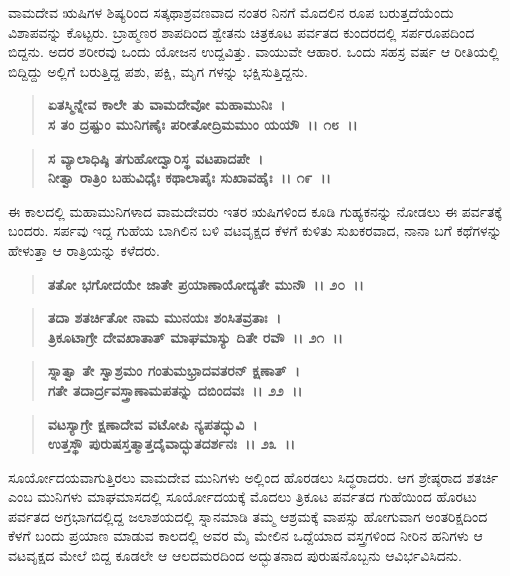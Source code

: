 ವಾಮದೇವ ಋಷಿಗಳ ಶಿಷ್ಯರಿಂದ ಸತ್ಕಥಾಶ್ರವಣವಾದ ನಂತರ ನಿನಗೆ ಮೊದಲಿನ ರೂಪ ಬರುತ್ತದೆಯೆಂದು ವಿಶಾಪವನ್ನು ಕೊಟ್ಟರು. ಬ್ರಾಹ್ಮಣರ ಶಾಪದಿಂದ ಶ್ವೇತನು ಚಿತ್ರಕೂಟ ಪರ್ವತದ ಕುಂದರದಲ್ಲಿ ಸರ್ಪರೂಪದಿಂದ ಬಿದ್ದನು. ಅದರ ಶರೀರವು ಒಂದು ಯೋಜನ ಉದ್ದವಿತ್ತು. ವಾಯುವೇ ಆಹಾರ. ಒಂದು ಸಹಸ್ರ ವರ್ಷ ಆ ರೀತಿಯಲ್ಲಿ ಬಿದ್ದಿದ್ದು ಅಲ್ಲಿಗೆ ಬರುತ್ತಿದ್ದ ಪಶು, ಪಕ್ಷಿ, ಮೃಗ ಗಳನ್ನು ಭಕ್ಷಿಸುತ್ತಿದ್ದನು.

\begin{verse}
\textbf{ಏತಸ್ಮಿನ್ನೇವ ಕಾಲೇ ತು ವಾಮದೇವೋ ಮಹಾಮುನಿಃ~।}\\\textbf{ಸ ತಂ ದ್ರಷ್ಟುಂ ಮುನಿಗಣೈಃ ಪರೀತೋದ್ರಿಮಮುಂ ಯಯೌ~।। ೧೮~।। }
\end{verse}

\begin{verse}
\textbf{ಸ ವ್ಯಾಲಾಧಿಷ್ಠಿ ತಗುಹೋದ್ವಾರಿಸ್ಥ ವಟಪಾದಪೇ~।}\\\textbf{ನೀತ್ವಾ ರಾತ್ರಿಂ ಬಹುವಿಧೈಃ ಕಥಾಲಾಪೈಃ ಸುಖಾವಹೈಃ~।। ೧೯~।।}
\end{verse}

ಈ ಕಾಲದಲ್ಲಿ ಮಹಾಮುನಿಗಳಾದ ವಾಮದೇವರು ಇತರ ಋಷಿಗಳಿಂದ ಕೂಡಿ ಗುಹ್ಯಕನನ್ನು ನೋಡಲು ಈ ಪರ್ವತಕ್ಕೆ ಬಂದರು. ಸರ್ಪವು ಇದ್ದ ಗುಹೆಯ ಬಾಗಿಲಿನ ಬಳಿ ವಟವೃಕ್ಷದ ಕೆಳಗೆ ಕುಳಿತು ಸುಖಕರವಾದ, ನಾನಾ ಬಗೆ ಕಥೆಗಳನ್ನು ಹೇಳುತ್ತಾ ಆ ರಾತ್ರಿಯನ್ನು ಕಳೆದರು.

\begin{verse}
\textbf{ತತೋ ಭಗೋದಯೇ ಜಾತೇ ಪ್ರಯಾಣಾಯೋದ್ಯತೇ ಮುನೌ~।। ೨೦~।।} 
\end{verse}

\begin{verse}
\textbf{ತದಾ ಶತರ್ಚಿತೋ ನಾಮ ಮುನಯಃ ಶಂಸಿತವ್ರತಾಃ~।}\\\textbf{ತ್ರಿಕೂಟಾಗ್ರೇ ದೇವಖಾತಾತ್ ಮಾಘಮಾಸ್ಯು ದಿತೇ ರವೌ~।। ೨೧~।। }
\end{verse}

\begin{verse}
\textbf{ಸ್ನಾತ್ವಾ ತೇ ಸ್ವಾಶ್ರಮಂ ಗಂತುಮಭ್ರಾದವತರನ್ ಕ್ಷಣಾತ್~।}\\\textbf{ಗತೇ ತದಾರ್ದ್ರವಸ್ತ್ರಾಣಾಮಪತನ್ನು ದಬಿಂದವಃ~।। ೨೨~।। }
\end{verse}

\begin{verse}
\textbf{ವಟಸ್ಯಾಗ್ರೇ ಕ್ಷಣಾದೇವ ವಟೋಪಿ ನ್ಯಪತದ್ಭುವಿ~।}\\\textbf{ಉತ್ತಸ್ಥೌ ಪುರುಷಸ್ತತ್ಮಾತ್ತದೈವಾದ್ಭುತದರ್ಶನಃ~।। ೨೩~।।}
\end{verse}

ಸೂರ್ಯೋದಯವಾಗುತ್ತಿರಲು ವಾಮದೇವ ಮುನಿಗಳು ಅಲ್ಲಿಂದ ಹೊರಡಲು ಸಿದ್ಧ\-ರಾದರು. ಆಗ ಶ್ರೇಷ್ಠರಾದ ಶತರ್ಚಿ ಎಂಬ ಮುನಿಗಳು ಮಾಘಮಾಸದಲ್ಲಿ ಸೂರ್ಯೋದಯಕ್ಕೆ ಮೊದಲು ತ್ರಿಕೂಟ ಪರ್ವತದ ಗುಹೆಯಿಂದ ಹೊರಟು ಪರ್ವತದ ಅಗ್ರಭಾಗದಲ್ಲಿದ್ದ ಜಲಾಶಯದಲ್ಲಿ ಸ್ನಾನಮಾಡಿ ತಮ್ಮ ಆಶ್ರಮಕ್ಕೆ ವಾಪಸ್ಸು ಹೋಗುವಾಗ ಅಂತರಿಕ್ಷದಿಂದ ಕೆಳಗೆ ಬಂದು ಪ್ರಯಾಣ ಮಾಡುವ ಕಾಲದಲ್ಲಿ ಅವರ ಮೈ ಮೇಲಿನ ಒದ್ದೆಯಾದ ವಸ್ತ್ರಗಳಿಂದ ನೀರಿನ ಹನಿಗಳು ಆ ವಟವೃಕ್ಷದ ಮೇಲೆ ಬಿದ್ದ ಕೂಡಲೇ ಆ ಆಲದಮರದಿಂದ ಅದ್ಭುತನಾದ ಪುರುಷನೊಬ್ಬನು ಆವಿರ್ಭವಿಸಿದನು.

